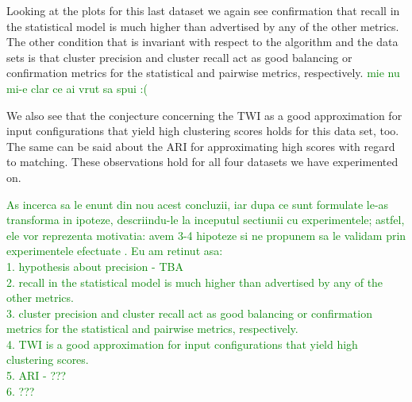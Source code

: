 Looking at the plots for this last dataset we again see confirmation that recall
in the statistical model is much higher than advertised by any of the other
metrics.
The other condition that is invariant with respect to the algorithm and the
data sets is that cluster precision and cluster recall act as good balancing or
confirmation metrics for the statistical and pairwise metrics, respectively.
\textcolor{green}{mie nu mi-e clar ce ai vrut sa spui :(}

We also see that the conjecture concerning the TWI as a good approximation for
input configurations that yield high clustering scores holds for this data set,
too. 
The same can be said about the ARI for approximating high scores with regard to
matching.
These observations hold for all four datasets we have experimented on.


\textcolor{green}{As incerca sa le enunt din nou acest concluzii, iar dupa ce sunt formulate le-as transforma in ipoteze, descriindu-le la inceputul sectiunii cu experimentele; astfel, ele vor reprezenta motivatia: avem 3-4 hipoteze si ne propunem sa le validam prin experimentele efectuate . Eu am retinut asa: \\
1. hypothesis about precision - TBA \\
2. recall in the statistical model is much higher than advertised by any of the other metrics.\\
3. cluster precision and cluster recall act as good balancing or
confirmation metrics for the statistical and pairwise metrics, respectively.\\
4. TWI is a good approximation for input configurations that yield high clustering scores.\\
5. ARI - ???\\
6. ???
}

